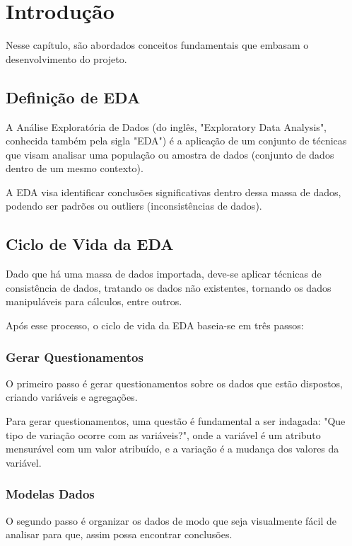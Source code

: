 \chapter{Introdução}	

Nesse capítulo, são abordados conceitos fundamentais que embasam o desenvolvimento do projeto.

\section{Definição de EDA}

A Análise Exploratória de Dados (do inglês, "Exploratory Data Analysis", conhecida também pela sigla "EDA") é a aplicação de um conjunto de técnicas que visam analisar uma população ou amostra de dados (conjunto de dados dentro de um mesmo contexto).

A EDA visa identificar conclusões significativas dentro dessa massa de dados, podendo ser padrões ou outliers (inconsistências de dados).

\section{Ciclo de Vida da EDA}

Dado que há uma massa de dados importada, deve-se aplicar técnicas de consistência de dados, tratando os dados não existentes, tornando os dados manipuláveis para cálculos, entre outros.

Após esse processo, o ciclo de vida da EDA baseia-se em três passos:

\subsection{Gerar Questionamentos}

O primeiro passo é gerar questionamentos sobre os dados que estão dispostos, criando variáveis e agregações.

Para gerar questionamentos, uma questão é fundamental a ser indagada: "Que tipo de variação ocorre com as variáveis?", onde a variável é um atributo mensurável com um valor atribuído, e a variação é a mudança dos valores da variável.

\subsection{Modelas Dados}

O segundo passo é organizar os dados de modo que seja visualmente fácil de analisar para que, assim possa encontrar conclusões.

